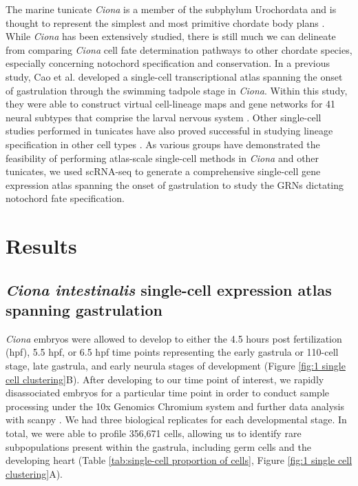 The marine tunicate \textit{Ciona} is a member of the subphylum Urochordata and is thought to represent the simplest and most primitive chordate body plans \cite{dehal2002,delsuc2006,imai2006,satoh2014,satou2005,satou2019}. While \textit{Ciona} has been extensively studied, there is still much we can delineate from comparing \textit{Ciona} cell fate determination pathways to other chordate species, especially concerning notochord specification and conservation. In a previous study, Cao et al. developed a single-cell transcriptional atlas spanning the onset of gastrulation through the swimming tadpole stage in \textit{Ciona}. Within this study, they were able to construct virtual cell-lineage maps and gene networks for 41 neural subtypes that comprise the larval nervous system \cite{cao2019}. Other single-cell studies performed in tunicates have also proved successful in studying lineage specification in other cell types \cite{winkley2021,sladitschek2020,zhang2020,ilsley2020,wang2019,horie2018,wang2021}. As various groups have demonstrated the feasibility of performing atlas-scale single-cell methods in \textit{Ciona} and other tunicates, we used scRNA-seq to generate a comprehensive single-cell gene expression atlas spanning the onset of gastrulation to study the GRNs dictating notochord fate specification. 

\section{Results}

\subsection{\textit{Ciona intestinalis} single-cell expression atlas spanning gastrulation}

\textit{Ciona} embryos were allowed to develop to either the 4.5 hours post fertilization (hpf), 5.5 hpf, or 6.5 hpf time points representing the early gastrula or 110-cell stage, late gastrula, and early neurula stages of development (Figure \ref{fig:1 single cell clustering}B). After developing to our time point of interest, we rapidly disassociated embryos for a particular time point in order to conduct sample processing under the 10x Genomics Chromium system and further data analysis with scanpy \cite{wolf2018}. We had three biological replicates for each developmental stage. In total, we were able to profile 356,671 cells, allowing us to identify rare subpopulations present within the gastrula, including germ cells and the developing heart (Table \ref{tab:single-cell proportion of cells}, Figure \ref{fig:1 single cell clustering}A). 

